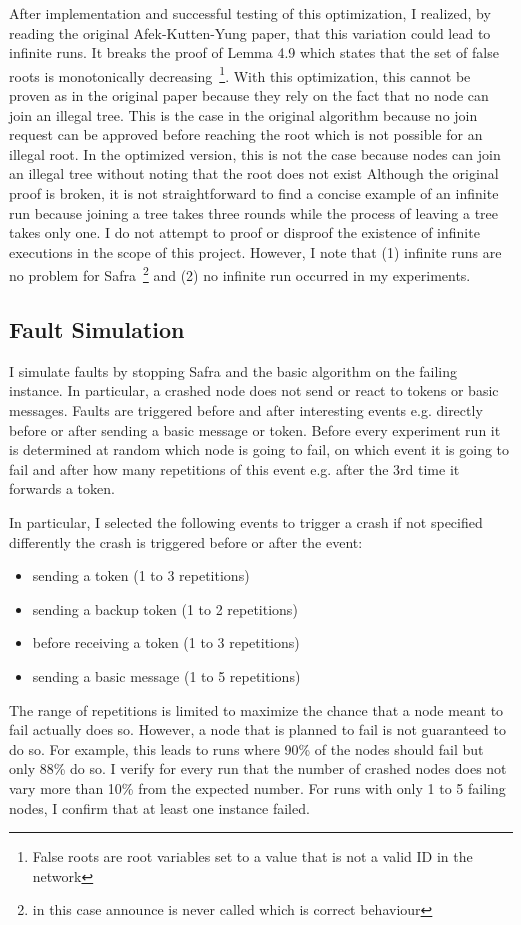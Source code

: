 After implementation and successful testing of this optimization, I realized, by reading the original Afek-Kutten-Yung paper, that this variation could lead to infinite runs. %
It breaks the proof of Lemma 4.9 which states that the set of false roots is monotonically decreasing~\footnote{False roots are root variables set to a value that is not a valid ID in the network}.
With this optimization, this cannot be proven as in the original paper because they rely on the fact that no node can join an illegal tree.
This is the case in the original algorithm because no join request can be approved before reaching the root which is not possible for an illegal root.
In the optimized version, this is not the case because nodes can join an illegal tree without noting that the root does not exist
Although the original proof is broken, it is not straightforward to find a concise example of an infinite run because joining a tree takes three rounds while the process of leaving a tree takes only one.
I do not attempt to proof or disproof the existence of infinite executions in the scope of this project.
However, I note that (1) infinite runs are no problem for Safra~\footnote{in this case announce is never called which is correct behaviour} and (2) no infinite run occurred in my experiments.

\subsection{Fault Simulation}
I simulate faults by stopping Safra and the basic algorithm on the failing instance.
In particular, a crashed node does not send or react to tokens or basic messages.
Faults are triggered before and after interesting events e.g. directly before or after sending a basic message or token.
Before every experiment run it is determined at random which node is going to fail, on which event it is going to fail and after how many repetitions of this event e.g. after the 3rd time it forwards a token.

In particular, I selected the following events to trigger a crash if not specified differently the crash is triggered before or after the event:
\begin{itemize}
    \item sending a token (1 to 3 repetitions)
    \item sending a backup token (1 to 2 repetitions)
    \item before receiving a token (1 to 3 repetitions)
    \item sending a basic message (1 to 5 repetitions)
\end{itemize}
The range of repetitions is limited to maximize the chance that a node meant to fail actually does so.
However, a node that is planned to fail is not guaranteed to do so.
For example, this leads to runs where 90\% of the nodes should fail but only 88\% do so.
I verify for every run that the number of crashed nodes does not vary more than 10\% from the expected number. For runs with only 1 to 5 failing nodes, I confirm that at least one instance failed.

